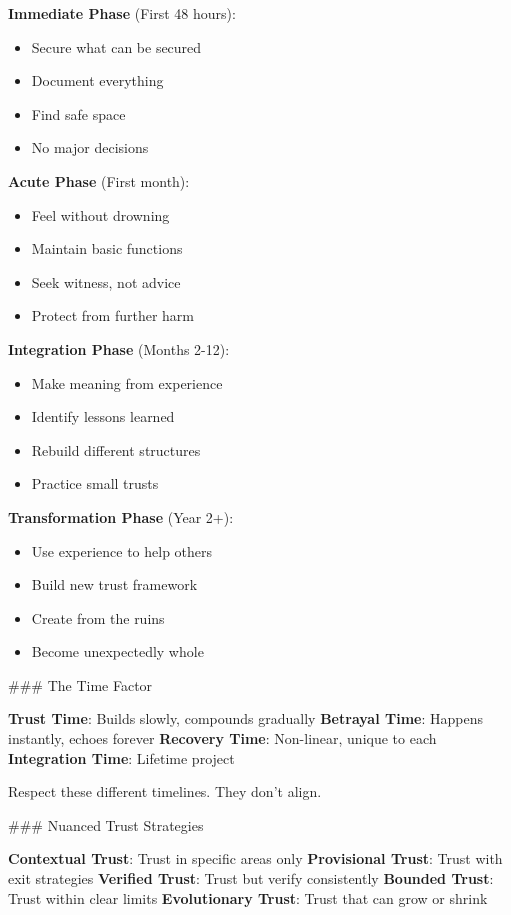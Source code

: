 \documentclass[12pt]{book}
\begin{document}
\textbf{Immediate Phase} (First 48 hours):
\begin{itemize}
\item Secure what can be secured
\item Document everything
\item Find safe space
\item No major decisions

\end{itemize}
\textbf{Acute Phase} (First month):
\begin{itemize}
\item Feel without drowning
\item Maintain basic functions
\item Seek witness, not advice
\item Protect from further harm

\end{itemize}
\textbf{Integration Phase} (Months 2-12):
\begin{itemize}
\item Make meaning from experience
\item Identify lessons learned
\item Rebuild different structures
\item Practice small trusts

\end{itemize}
\textbf{Transformation Phase} (Year 2+):
\begin{itemize}
\item Use experience to help others
\item Build new trust framework
\item Create from the ruins
\item Become unexpectedly whole

\end{itemize}
\#\#\# The Time Factor

\textbf{Trust Time}: Builds slowly, compounds gradually
\textbf{Betrayal Time}: Happens instantly, echoes forever
\textbf{Recovery Time}: Non-linear, unique to each
\textbf{Integration Time}: Lifetime project

Respect these different timelines. They don't align.

\#\#\# Nuanced Trust Strategies

\textbf{Contextual Trust}: Trust in specific areas only
\textbf{Provisional Trust}: Trust with exit strategies
\textbf{Verified Trust}: Trust but verify consistently
\textbf{Bounded Trust}: Trust within clear limits
\textbf{Evolutionary Trust}: Trust that can grow or shrink
\end{document}
